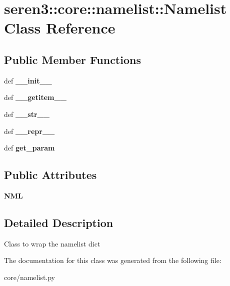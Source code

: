 \hypertarget{classseren3_1_1core_1_1namelist_1_1Namelist}{
\section{seren3::core::namelist::Namelist Class Reference}
\label{classseren3_1_1core_1_1namelist_1_1Namelist}
}
\subsection*{Public Member Functions}
\begin{DoxyCompactItemize}
\item 
\hypertarget{classseren3_1_1core_1_1namelist_1_1Namelist_a5d09e5d6119e98d55a289b9f0ff53444}{
def {\bfseries \_\-\_\-init\_\-\_\-}}
\label{classseren3_1_1core_1_1namelist_1_1Namelist_a5d09e5d6119e98d55a289b9f0ff53444}

\item 
\hypertarget{classseren3_1_1core_1_1namelist_1_1Namelist_a885caeaccdf034e7af9f8f54c6138f6c}{
def {\bfseries \_\-\_\-getitem\_\-\_\-}}
\label{classseren3_1_1core_1_1namelist_1_1Namelist_a885caeaccdf034e7af9f8f54c6138f6c}

\item 
\hypertarget{classseren3_1_1core_1_1namelist_1_1Namelist_a33b1c9e0619c19449d4c2d8d1912f1bb}{
def {\bfseries \_\-\_\-str\_\-\_\-}}
\label{classseren3_1_1core_1_1namelist_1_1Namelist_a33b1c9e0619c19449d4c2d8d1912f1bb}

\item 
\hypertarget{classseren3_1_1core_1_1namelist_1_1Namelist_adc756acfb874a5c6c50cd85b6c006b79}{
def {\bfseries \_\-\_\-repr\_\-\_\-}}
\label{classseren3_1_1core_1_1namelist_1_1Namelist_adc756acfb874a5c6c50cd85b6c006b79}

\item 
\hypertarget{classseren3_1_1core_1_1namelist_1_1Namelist_aeaadc5f1960aa6fc7810a6c16593c06b}{
def {\bfseries get\_\-param}}
\label{classseren3_1_1core_1_1namelist_1_1Namelist_aeaadc5f1960aa6fc7810a6c16593c06b}

\end{DoxyCompactItemize}
\subsection*{Public Attributes}
\begin{DoxyCompactItemize}
\item 
\hypertarget{classseren3_1_1core_1_1namelist_1_1Namelist_a626aa62babb89552d212e5c37132f333}{
{\bfseries NML}}
\label{classseren3_1_1core_1_1namelist_1_1Namelist_a626aa62babb89552d212e5c37132f333}

\end{DoxyCompactItemize}


\subsection{Detailed Description}
\begin{DoxyVerb}
Class to wrap the namelist dict
\end{DoxyVerb}
 

The documentation for this class was generated from the following file:\begin{DoxyCompactItemize}
\item 
core/namelist.py\end{DoxyCompactItemize}
